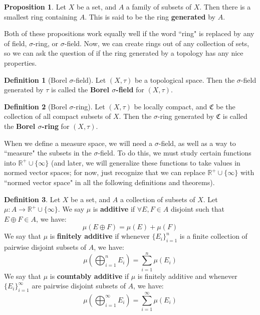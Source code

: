 \documentclass[11pt, oneside]{amsart}   	%
\theoremstyle{definition}
\newtheorem{definition}{Definition}[section]
\newtheorem{prop}{Proposition}[section]
\begin{document}
	\begin{prop}
		Let $X$ be a set, and $A$ a family of subsets of $X$. Then there is a smallest ring containing $A$. This is said to be 
		the ring \textbf{generated} by $A$.
	\end{prop}
	
	Both of these propositions work equally well if the word ``ring" is replaced by any of field, $\sigma$-ring, or $\sigma$-field. 
	Now, we can create rings out of any collection of sets, so we can ask the question of if the ring generated by a topology 
	has any nice properties. 
	
	\begin{definition}[Borel $\sigma$-field]
		Let $(X, \tau)$ be a topological space. Then the $\sigma$-field generated by $\tau$ is called the \textbf{Borel 
		$\sigma$-field} for $(X, \tau)$. 
	\end{definition}
	
	\begin{definition}[Borel $\sigma$-ring]
		Let $(X, \tau)$ be locally compact, and $\mathfrak C$ be the collection of all compact subsets of $X$. Then the 
		$\sigma$-ring generated by $\mathfrak C$ is called the \textbf{Borel $\sigma$-ring} for $(X, \tau)$. 
	\end{definition}
	
	When we define a measure space, we will need a $\sigma$-field, as well as a way to ``measure" the subsets in the 
	$\sigma$-field. To do this, we must study certain functions into $\mathbb R^+\cup\{\infty\}$ (and later, we will generalize 
	these functions to take values in normed vector spaces; for now, just recognize that we can replace $\mathbb R^+\cup
	\{\infty\}$ with ``normed vector space" in all the following definitions and theorems). 
	
	\begin{definition}
		Let $X$ be a set, and $A$ a collection of subsets of $X$. Let $\mu : A\rightarrow\mathbb R^+\cup\{\infty\}$. We say 
		$\mu$ is \textbf{additive} if $\forall E, F\in A$ disjoint such that $E\oplus F\in A$, we have:
		$$
			\mu(E\oplus F) = \mu(E) + \mu(F)
		$$
		We say that $\mu$ is \textbf{finitely additive} if whenever $\{E_i\}_{i = 1}^n$ is a finite collection of pairwise disjoint 
		subsets of $A$, we have:
		$$
			\mu(\bigoplus_{i = 1}^n E_i) = \sum_{i = 1}^n\mu(E_i)
		$$
		We say that $\mu$ is \textbf{countably additive} if $\mu$ is finitely additive and whenever $\{E_i\}_{i = 1}^\infty$ are 
		pairwise disjoint subsets of $A$, we have:
		$$
			\mu(\bigoplus_{i = 1}^\infty E_i) = \sum_{i = 1}^\infty\mu(E_i)
		$$
	\end{definition}
	
\end{document}
